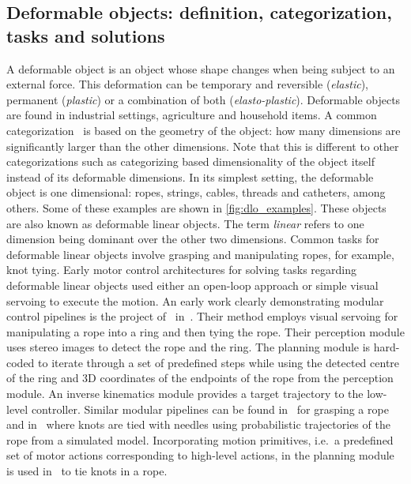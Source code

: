 \subsection{Deformable objects: definition, categorization, tasks and solutions}
A deformable object is an object whose shape changes when being subject to an external force. This deformation can be temporary and reversible (\textit{elastic}), permanent (\textit{plastic}) or a combination of both (\textit{elasto-plastic}). Deformable objects are found in industrial settings, agriculture and household items. A common categorization~\autocite{Saadat2002,Jimenez2012} is based on the geometry of the object: how many dimensions are significantly larger than the other dimensions. Note that this is different to other categorizations such as categorizing based dimensionality of the object itself instead of its deformable dimensions.
In its simplest setting, the deformable object is one dimensional: ropes, strings, cables, threads and catheters, among others. Some of these examples are shown in \cref{fig:dlo_examples}. These objects are also known as deformable linear objects. The term \textit{linear} refers to one dimension being dominant over the other two dimensions. Common tasks for deformable linear objects involve grasping and manipulating ropes, for example, knot tying. Early motor control architectures for solving tasks regarding deformable linear objects used either an open-loop approach or simple visual servoing to execute the motion. An early work clearly demonstrating modular control pipelines is the project of~\citeauthor{Inaba1987} in~\citeyear{Inaba1987}. Their method employs visual servoing for manipulating a rope into a ring and then tying the rope. 
Their perception module uses stereo images to detect the rope and the ring. The planning module is hard-coded to iterate through a set of predefined steps while using the detected centre of the ring and 3D coordinates of the endpoints of the rope from the perception module. An inverse kinematics module provides a target trajectory to the low-level controller. Similar modular pipelines can be found in~\autocite{Remde1999} for grasping a rope and in~\autocite{Saha2007} where knots are tied with needles using probabilistic trajectories of the rope from a simulated model. Incorporating motion primitives, i.e.\ a predefined set of motor actions corresponding to high-level actions, in the planning module is used in~\autocite{Yamakawa2008, Vinh2012} to tie knots in a rope.

